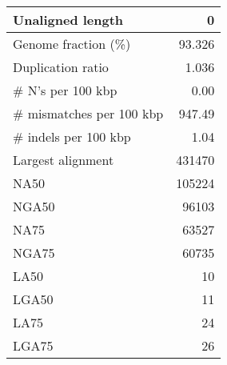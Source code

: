 \documentclass[12pt,a4paper]{article}
\begin{document}
\begin{table}[ht]
\begin{center}
\begin{tabular}{|l*{1}{|r}|}
Unaligned length & 0 \\ \hline
Genome fraction (\%) & 93.326 \\ \hline
Duplication ratio & 1.036 \\ \hline
\# N's per 100 kbp & 0.00 \\ \hline
\# mismatches per 100 kbp & 947.49 \\ \hline
\# indels per 100 kbp & 1.04 \\ \hline
Largest alignment & 431470 \\ \hline
NA50 & 105224 \\ \hline
NGA50 & 96103 \\ \hline
NA75 & 63527 \\ \hline
NGA75 & 60735 \\ \hline
LA50 & 10 \\ \hline
LGA50 & 11 \\ \hline
LA75 & 24 \\ \hline
LGA75 & 26 \\ \hline
\end{tabular}
\end{center}
\end{table}
\end{document}
